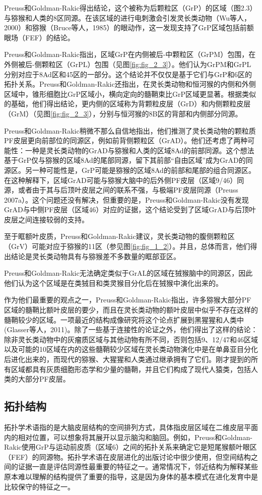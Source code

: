 Preuss和Goldman-Rakic得出结论，这个被称为后颗粒区（GrP）的区域（图2.3）与猕猴和人类的8区同源。在该区域的进行电刺激会引发灵长类动物（Wu等人，2000）和猕猴（Bruce等人，1985）的眼动作，这一发现支持了GrP区域包括前额眼场（FEF）的结论。

Preuss和Goldman-Rakic指出，区域GrP在内侧被后-中颗粒区（GrPM）包围，在外侧被后-侧颗粒区（GrPL）包围（见图\ref{fig:fig_2_3}）。他们认为GrPM和GrPL分别对应于8Ad区和45区的一部分。这个结论并不仅仅是基于它们与GrP和6区的拓扑关系。Preuss和Goldman-Rakic还指出，在灵长类动物和恒河猴的内侧和外侧区域中，锥形细胞比GrP区域小，横向定向的髓鞘束比GrP区域更显著。根据类似的基础，他们得出结论，更内侧的区域称为背颗粒皮层（GrD）和内侧颗粒皮层（GrM）（见图\ref{fig:fig_2_3}），分别与恒河猴的8B区的背部和内侧部分同源。

Preuss和Goldman-Rakic稍微不那么自信地指出，他们推测了灵长类动物的颗粒质PF皮层更向前部位的同源区，例如前背侧颗粒区（GrAD）。他们还考虑了两种可能性：一种是灵长类动物的GrAD与猕猴和人类的区域8Ad的前部同源。这个想法基于GrP仅与猕猴的区域8Ad的尾部同源，留下其前部“自由区域”成为GrAD的同源区。另一种可能性是，GrP可能是猕猴的区域8Ad的前部和尾部的组合同源区。在这种解释下，区域GrAD可能与猕猴大脑中的后外侧PF皮层（区域9/46）同源，或者由于其与后顶叶皮层之间的联系不强，与极端PF皮层同源（Preuss 2007a）。这个问题还没有解决，但重要的是，Preuss和Goldman-Rakic没有发现GrAD与中侧PF皮层（区域46）对应的证据，这个结论受到了区域GrAD与后顶叶皮层之间连接较弱的支持。

至于眶额叶皮质，Preuss和Goldman-Rakic建议，灵长类动物的腹侧颗粒区（GrV）可能对应于猕猴的11区（参见图\ref{fig:fig_1_2}）。并且，总体而言，他们得出结论是灵长类动物具有与猕猴差不多数量的眶部亚区。

Preuss和Goldman-Rakic无法确定类似于GrAL的区域在狨猴脑中的同源区，因此他们认为这个区域是在类狨目和类灵猴目分化后在狨猴中演化出来的。

作为他们最重要的观点之一，Preuss和Goldman-Rakic指出，许多猕猴大部分PF区域的髓鞘比额叶皮层的要少，而且在灵长类动物的额叶皮层中似乎不存在这样的髓鞘较少的区域。一项最近的结构成像研究将这个论点扩展到黑猩猩和人类中(Glasser等人，2011)。除了一些基于连接性的论证之外，他们得出了这样的结论：除非灵长类动物中的灰瘤质区域与其他动物有所不同，否则包括9、12/47和46区域以及可能的10区域在内的这些髓鞘较少区域在灵长类动物演化中是在单鼻亚目分化后进化出来的，而现代的猕猴、大猩猩和人类通过继承拥有了它们。刚才提到的所有区域都具有灰质细胞形态学和少量的髓鞘，并且它们构成了现代人猿类，包括人类的大部分PF皮层。

\subsection{拓扑结构}
拓扑学术语指的是大脑皮层结构的空间排列方式，具体指皮层区域在二维皮层平面内的相对位置，可以想象将其展开以显示脑沟和脑回。例如，Preuss和Goldman-Rakic使用GrP与运动前皮质（区域6）之间的拓扑关系来确定它是短尾猴额叶眼区（FEF）的同源物。拓扑学术语在皮层进化的出版讨论中很少使用，但空间结构之间的证据一直是评估同源性最重要的特征之一。通常情况下，邻近结构为解释某些原本难以理解的结构提供了重要的指导，这是因为身体的基本模式在进化发育中是比较保守的特征之一。

